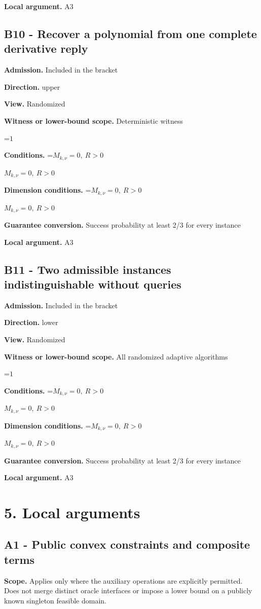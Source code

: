 \documentclass[10pt,a4paper]{article}
\newcommand{\AtlasMath}[1]{\par\begingroup\centering\setbox0=\hbox{$\displaystyle #1$}\ifdim\wd0>1.4\linewidth\typeout{ATLAS WIDE FORMULA: \the\wd0}\fi\ifdim\wd0>\linewidth\resizebox{\linewidth}{!}{\box0}\else\box0\fi\par\endgroup}
\newcommand{\AtlasInlineMath}[1]{\begingroup\setbox0=\hbox{$#1$}\ifdim\wd0>.4\linewidth\endgroup\AtlasMath{#1}\else\endgroup$#1$\fi}
\begin{document}
\textbf{Local argument.} A3

\subsection{B10 - Recover a polynomial from one complete derivative reply}
\textbf{Admission.} Included in the bracket

\textbf{Direction.} upper

\textbf{View.} Randomized

\textbf{Witness or lower-bound scope.} Deterministic witness

\AtlasMath{1}
\textbf{Conditions.} \AtlasInlineMath{M_{k,\nu}=0,\ R>0}

\textbf{Dimension conditions.} \AtlasInlineMath{M_{k,\nu}=0,\ R>0}

\textbf{Guarantee conversion.} Success probability at least 2/3 for every instance

\textbf{Local argument.} A3

\subsection{B11 - Two admissible instances indistinguishable without queries}
\textbf{Admission.} Included in the bracket

\textbf{Direction.} lower

\textbf{View.} Randomized

\textbf{Witness or lower-bound scope.} All randomized adaptive algorithms

\AtlasMath{1}
\textbf{Conditions.} \AtlasInlineMath{M_{k,\nu}=0,\ R>0}

\textbf{Dimension conditions.} \AtlasInlineMath{M_{k,\nu}=0,\ R>0}

\textbf{Guarantee conversion.} Success probability at least 2/3 for every instance

\textbf{Local argument.} A3

\section{5. Local arguments}
\subsection{A1 - Public convex constraints and composite terms}
\textbf{Scope.} Applies only where the auxiliary operations are explicitly permitted. Does not merge distinct oracle interfaces or impose a lower bound on a publicly known singleton feasible domain.
\end{document}

